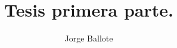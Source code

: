 \documentclass[12pt]{book}
\theoremstyle{plain}
\begin{document}
\title{Tesis primera parte.}
\author{Jorge Ballote}
\thispagestyle{plain}


% 
% 
\newpage
{}

% 
% 



    
\end{document}
